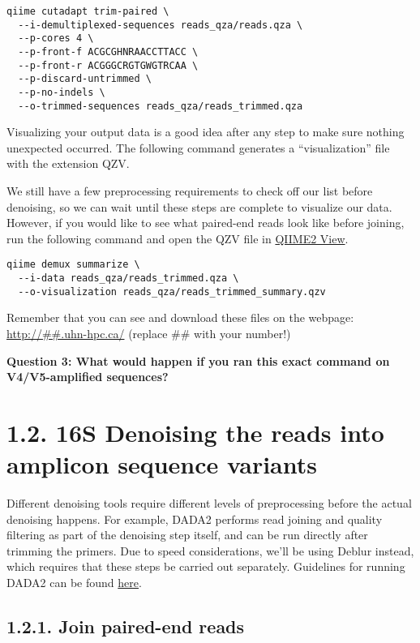\documentclass[
]{book}
\begin{document}
\begin{verbatim}
qiime cutadapt trim-paired \
  --i-demultiplexed-sequences reads_qza/reads.qza \
  --p-cores 4 \
  --p-front-f ACGCGHNRAACCTTACC \
  --p-front-r ACGGGCRGTGWGTRCAA \
  --p-discard-untrimmed \
  --p-no-indels \
  --o-trimmed-sequences reads_qza/reads_trimmed.qza
\end{verbatim}

Visualizing your output data is a good idea after any step to make sure nothing unexpected occurred. The following command generates a ``visualization'' file with the extension QZV.

We still have a few preprocessing requirements to check off our list before denoising, so we can wait until these steps are complete to visualize our data. However, if you would like to see what paired-end reads look like before joining, run the following command and open the QZV file in \href{https://view.qiime2.org/}{QIIME2 View}.

\begin{verbatim}
qiime demux summarize \
  --i-data reads_qza/reads_trimmed.qza \
  --o-visualization reads_qza/reads_trimmed_summary.qzv
\end{verbatim}

Remember that you can see and download these files on the webpage: \url{http://\#\#.uhn-hpc.ca/} (replace \#\# with your number!)

\textbf{Question 3: What would happen if you ran this exact command on V4/V5-amplified sequences?}

\section{1.2. 16S Denoising the reads into amplicon sequence variants}\label{s-denoising-the-reads-into-amplicon-sequence-variants}

Different denoising tools require different levels of preprocessing before the actual denoising happens. For example, DADA2 performs read joining and quality filtering as part of the denoising step itself, and can be run directly after trimming the primers. Due to speed considerations, we'll be using Deblur instead, which requires that these steps be carried out separately. Guidelines for running DADA2 can be found \href{https://github.com/LangilleLab/microbiome_helper/wiki/QIIME2-DADA2-Quick-Reference}{here}.

\subsection{1.2.1. Join paired-end reads}\label{join-paired-end-reads}
\end{document}
